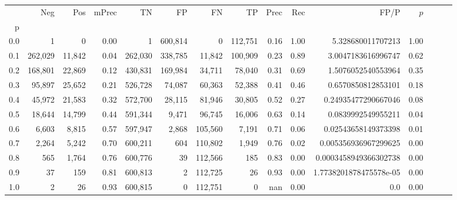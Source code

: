 \begin{tabular}{rrrrrrrrrrrrrrr}
\toprule
{} &      Neg &     Pos & mPrec &       TN &       FP &       FN &       TP &  Prec &   Rec &                    FP/P & $\hat{p}$ \\
p   &          &         &       &          &          &          &          &       &       &                         &           \\
\midrule
0.0 &        1 &       0 &  0.00 &        1 &  600,814 &        0 &  112,751 &  0.16 &  1.00 &       5.328680011707213 &      1.00 \\
0.1 &  262,029 &  11,842 &  0.04 &  262,030 &  338,785 &   11,842 &  100,909 &  0.23 &  0.89 &      3.0047183616996747 &      0.62 \\
0.2 &  168,801 &  22,869 &  0.12 &  430,831 &  169,984 &   34,711 &   78,040 &  0.31 &  0.69 &      1.5076052540553964 &      0.35 \\
0.3 &   95,897 &  25,652 &  0.21 &  526,728 &   74,087 &   60,363 &   52,388 &  0.41 &  0.46 &      0.6570850812853101 &      0.18 \\
0.4 &   45,972 &  21,583 &  0.32 &  572,700 &   28,115 &   81,946 &   30,805 &  0.52 &  0.27 &     0.24935477290667046 &      0.08 \\
0.5 &   18,644 &  14,799 &  0.44 &  591,344 &    9,471 &   96,745 &   16,006 &  0.63 &  0.14 &      0.0839992549955211 &      0.04 \\
0.6 &    6,603 &   8,815 &  0.57 &  597,947 &    2,868 &  105,560 &    7,191 &  0.71 &  0.06 &     0.02543658149373398 &      0.01 \\
0.7 &    2,264 &   5,242 &  0.70 &  600,211 &      604 &  110,802 &    1,949 &  0.76 &  0.02 &    0.005356936967299625 &      0.00 \\
0.8 &      565 &   1,764 &  0.76 &  600,776 &       39 &  112,566 &      185 &  0.83 &  0.00 &   0.0003458949366302738 &      0.00 \\
0.9 &       37 &     159 &  0.81 &  600,813 &        2 &  112,725 &       26 &  0.93 &  0.00 &  1.7738201878475578e-05 &      0.00 \\
1.0 &        2 &      26 &  0.93 &  600,815 &        0 &  112,751 &        0 &   nan &  0.00 &                     0.0 &      0.00 \\
\bottomrule
\end{tabular}
